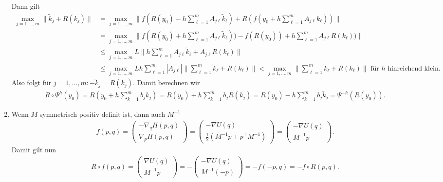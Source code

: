 \begin{solution}
\begin{enumerate}[label = \textbf{\alph*)}]
  Dann gilt
  \begin{align*}
    \max_{j=1,\dots,m}\|\widetilde{k}_j + R(k_j)\| &= \max_{j=1,\dots,m}
    \|f(R(y_0) - h\sum_{\ell = 1}^m A_{j\ell}\widetilde{k}_{\ell}) +
    R(f(y_0 + h\sum_{\ell = 1}^m A_{j\ell}k_{\ell}))\| \\
    &= \max_{j=1,\dots,m}\|f(R(y_0) + h\sum_{\ell = 1}^m A_{j\ell}\widetilde{k}_{\ell}))
    - f(R(y_0)) + h\sum_{\ell = 1}^m A_{j\ell}R(k_{\ell}))\| \\
    &\leq \max_{j=1,\dots,m}L\|h\sum_{\ell = 1}^m A_{j\ell}\widetilde{k}_{\ell} + A_{j\ell}R(k_{\ell})\| \\
    &\leq \max_{j=1,\dots,m}Lh\sum_{\ell = 1}^m |A_{j\ell}|\|\sum_{\ell = 1}^m\widetilde{k}_{\ell} + R(k_{\ell})\|
    < \max_{j=1,\dots,m}\|\sum_{\ell = 1}^m\widetilde{k}_{\ell} + R(k_{\ell})\| \text{ für $h$ hinreichend klein.}
  \end{align*}
  Also folgt für $j = 1,\dots,m: -\widetilde{k}_j = R(k_j)$. Damit berechnen wir
  \begin{align*}
    R \circ \Psi^h(y_0) = R(y_0 + h\sum_{k=1}^mb_jk_j)
    = R(y_0) + h\sum_{k=1}^mb_jR(k_j) = R(y_0) - h\sum_{k=1}^mb_j\widetilde{k}_j
    = \Psi^{-h}(R(y_0)).
  \end{align*}
  \item Wenn $M$ symmetrisch positiv definit ist, dann auch $M^{-1}$
  \begin{align*}
    f(p,q) = \begin{pmatrix}
      -\nabla_q H(p,q) \\ \nabla_p H(p,q)
    \end{pmatrix}
    = \begin{pmatrix}
      -\nabla U(q) \\ \frac{1}{2}(M^{-1}p + p^{\top}M^{-1})
    \end{pmatrix}
    = \begin{pmatrix}
      -\nabla U(q) \\ M^{-1}p
    \end{pmatrix}.
  \end{align*}
  Damit gilt nun
  \begin{align*}
    R\circ f (p,q) = \begin{pmatrix}
      \nabla U(q) \\ M^{-1}p
    \end{pmatrix}
    = - \begin{pmatrix}
      -\nabla U(q) \\ M^{-1}(-p)
    \end{pmatrix}
    = -f(-p,q) = -f\circ R(p,q).
  \end{align*}
\end{enumerate}

\end{solution}
